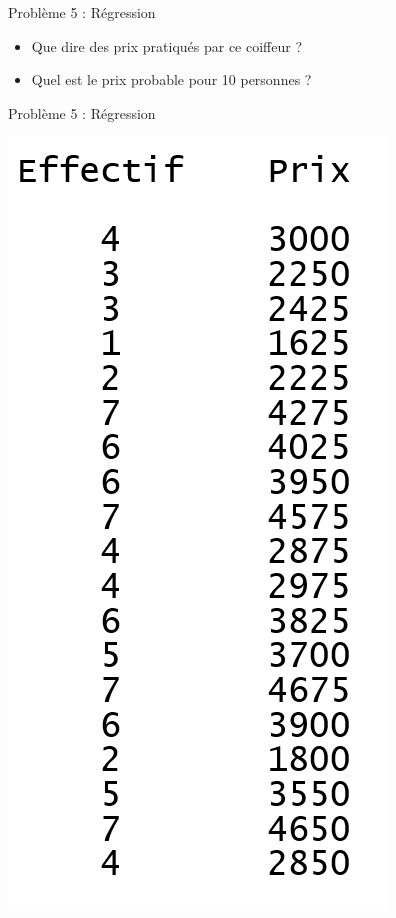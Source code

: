 \documentclass[10pt]{beamer}
\begin{document}
\begin{frame}{Problème 5 : Régression}
\begin{itemize}
    \item Que dire des prix pratiqués par ce coiffeur ? 
    \item Quel est le prix probable pour 10 personnes ?
\end{itemize}

\end{frame}


\begin{frame}{Problème 5 : Régression} 
\hspace{-0.12\textwidth}
\begin{minipage}{0.45\textwidth}
 \begin{center}
\includegraphics[height=\textwidth]{figures/data_coiffeur.PNG}
\end{center} 
\end{minipage}
\begin{minipage}{0.53\textwidth}
\begin{center}

\end{center}
\end{minipage}
\end{frame}
\end{document}
